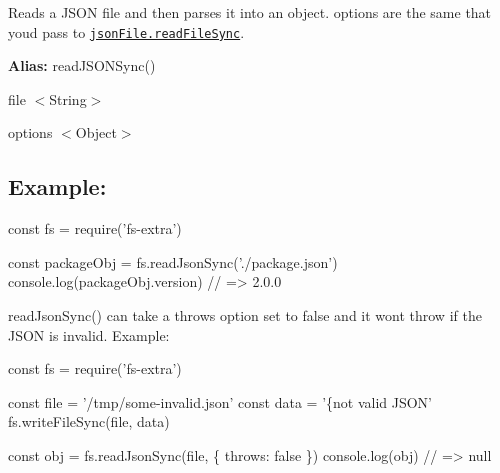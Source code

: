 Reads a J\+S\+ON file and then parses it into an object. {\ttfamily options} are the same that you\textquotesingle{}d pass to \href{https://github.com/jprichardson/node-jsonfile#readfilesyncfilename-options}{\tt {\ttfamily json\+File.\+read\+File\+Sync}}.

{\bfseries Alias\+:} {\ttfamily read\+J\+S\+O\+N\+Sync()}


\begin{DoxyItemize}
\item {\ttfamily file} {\ttfamily $<$String$>$}
\item {\ttfamily options} {\ttfamily $<$Object$>$}
\end{DoxyItemize}

\subsection*{Example\+:}


\begin{DoxyCode}
const fs = require('fs-extra')

const packageObj = fs.readJsonSync('./package.json')
console.log(packageObj.version) // => 2.0.0
\end{DoxyCode}
 



{\ttfamily read\+Json\+Sync()} can take a {\ttfamily throws} option set to {\ttfamily false} and it won\textquotesingle{}t throw if the J\+S\+ON is invalid. Example\+:


\begin{DoxyCode}
const fs = require('fs-extra')

const file = '/tmp/some-invalid.json'
const data = '\{not valid JSON'
fs.writeFileSync(file, data)

const obj = fs.readJsonSync(file, \{ throws: false \})
console.log(obj) // => null
\end{DoxyCode}
 